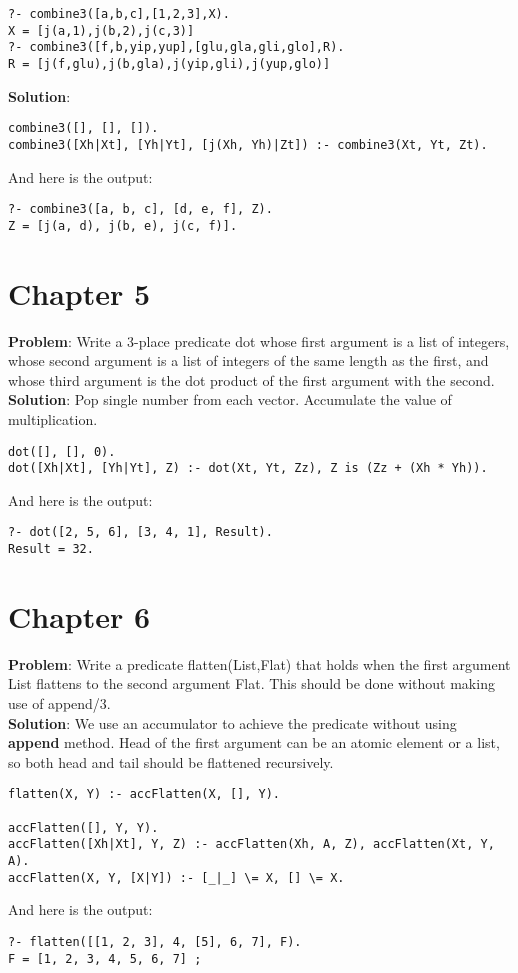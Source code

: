 \documentclass{article}
\begin{document}
\begin{verbatim}
?- combine3([a,b,c],[1,2,3],X).
X = [j(a,1),j(b,2),j(c,3)]
?- combine3([f,b,yip,yup],[glu,gla,gli,glo],R).
R = [j(f,glu),j(b,gla),j(yip,gli),j(yup,glo)]
\end{verbatim}

\noindent
\textbf{Solution}:
\begin{verbatim}
combine3([], [], []).
combine3([Xh|Xt], [Yh|Yt], [j(Xh, Yh)|Zt]) :- combine3(Xt, Yt, Zt).
\end{verbatim}

\noindent
And here is the output:
\begin{verbatim}
?- combine3([a, b, c], [d, e, f], Z).
Z = [j(a, d), j(b, e), j(c, f)].
\end{verbatim}


\section{Chapter 5}
\textbf{Problem}: Write a 3-place predicate dot
whose first argument is a list of integers,
whose second argument is a list of integers
of the same length as the first,
and whose third argument is the dot product of the first argument
with the second. \\

\noindent
\textbf{Solution}: Pop single number from each vector.
Accumulate the value of multiplication.
\begin{verbatim}
dot([], [], 0).
dot([Xh|Xt], [Yh|Yt], Z) :- dot(Xt, Yt, Zz), Z is (Zz + (Xh * Yh)).
\end{verbatim}

\noindent
And here is the output:
\begin{verbatim}
?- dot([2, 5, 6], [3, 4, 1], Result).
Result = 32.  
\end{verbatim}

\section{Chapter 6}
\textbf{Problem}: Write a predicate flatten(List,Flat)
that holds when the first argument List flattens to the second argument Flat.
This should be done without making use of append/3. \\

\noindent
\textbf{Solution}:
We use an accumulator to achieve the predicate
without using \textbf{append} method.
Head of the first argument can be an atomic element or a list,
so both head and tail should be flattened recursively. 
\begin{verbatim}
flatten(X, Y) :- accFlatten(X, [], Y).

accFlatten([], Y, Y).
accFlatten([Xh|Xt], Y, Z) :- accFlatten(Xh, A, Z), accFlatten(Xt, Y, A).
accFlatten(X, Y, [X|Y]) :- [_|_] \= X, [] \= X.
\end{verbatim}

And here is the output:
\begin{verbatim}
?- flatten([[1, 2, 3], 4, [5], 6, 7], F).
F = [1, 2, 3, 4, 5, 6, 7] ;
\end{verbatim}
\end{document}

